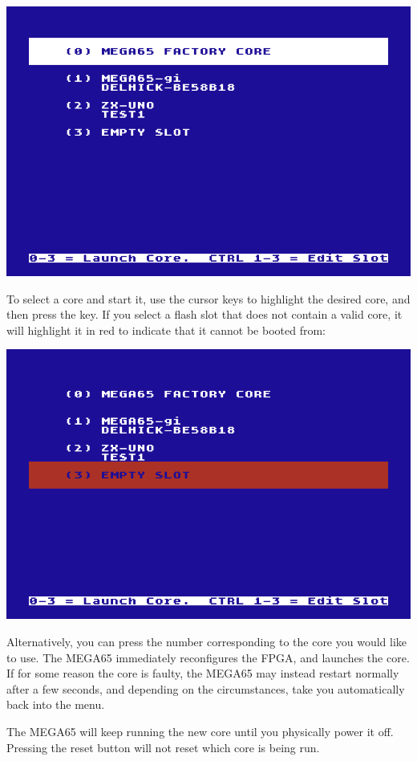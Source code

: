 \includegraphics[width=\linewidth]{images/ss-flashmenu.png}

To select a core and start it, use the cursor keys to highlight the desired core, and then press the
 key.  If you select a flash slot that does not
contain a valid core, it will highlight it in red to indicate that it
cannot be booted from:

\includegraphics[width=\linewidth]{images/ss-flashmenu-invalidslot.png}

Alternatively, you can press the number corresponding to the core you would
like to use. The MEGA65 immediately reconfigures the FPGA, and launches the core.  If for some reason
the core is faulty, the MEGA65 may instead restart normally after a few seconds, and depending on the
circumstances, take you automatically back into the menu.

The MEGA65 will keep running the new core until you physically power it off.  Pressing the reset button
will not reset which core is being run.


